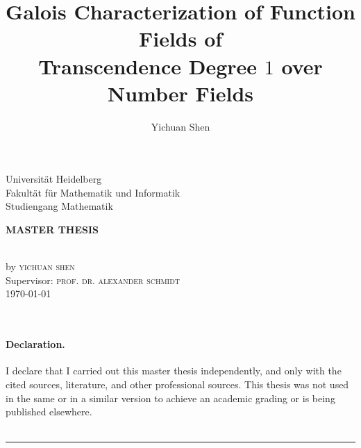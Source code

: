 \documentclass[11pt, a4paper, openany]{memoir}
\author{Yichuan Shen}
\title{Galois Characterization of Function Fields of \\ Transcendence Degree $1$ over Number Fields}
\begin{document}
\theoremstyle{plain}
\theoremstyle{definition}
\newtheorem{theorem}{Theorem}[chapter]
\newtheorem{lemma}[theorem]{Lemma}
\newtheorem{proposition}[theorem]{Proposition}
\newtheorem{corollary}[theorem]{Corollary}
\theoremstyle{definition}
\newtheorem*{definition}{Definition}
\newtheorem*{example}{Example}
\theoremstyle{remark}
\newtheorem{remark}[theorem]{Remark}
\newtheorem{step}{Step}

\frontmatter
{}

\makeatletter
\begin{center}
\vspace*{0cm}
\begin{large}
Universität Heidelberg\\
Fakultät für Mathematik und Informatik\\
Studiengang Mathematik\\
\vspace{8mm}
\end{large}
\vfill
\begin{large}
\textbf{MASTER THESIS}\\
\end{large}
\vspace{10mm}
\linespread{2}\selectfont
\begin{huge}\@title \end{huge}\\
\linespread{1.1}\selectfont
\vspace{10mm}
by \textsc{yichuan shen}\\
\vspace{3cm}
\vfill
Supervisor: \textsc{prof. dr. alexander schmidt}\\
\today
\end{center}
\makeatother

\clearpage
\
\clearpage

\vspace*{0cm}
\vfill
\paragraph{Declaration.} I declare that I carried out this master thesis independently, and only with the cited sources, literature, and other professional sources. This thesis was not used in the same or in a similar version to achieve an academic grading or is being published elsewhere.\\
\vspace{7mm}\\
\rule{7cm}{0.4pt}
\clearpage
\end{document}

